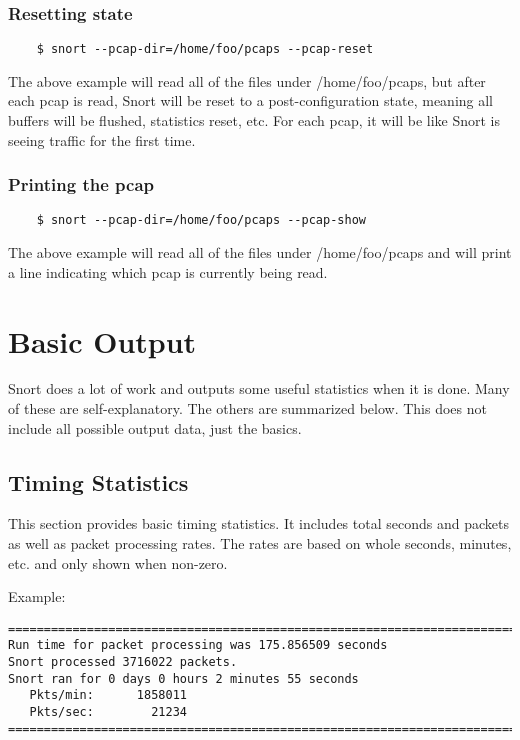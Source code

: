 \documentclass[english]{report}
\begin{document}
\subsubsection{Resetting state}

\begin{verbatim}
    $ snort --pcap-dir=/home/foo/pcaps --pcap-reset
\end{verbatim}

The above example will read all of the files under /home/foo/pcaps, but after
each pcap is read, Snort will be reset to a post-configuration state, meaning
all buffers will be flushed, statistics reset, etc.  For each pcap, it will be
like Snort is seeing traffic for the first time.

\subsubsection{Printing the pcap}

\begin{verbatim}
    $ snort --pcap-dir=/home/foo/pcaps --pcap-show
\end{verbatim}

The above example will read all of the files under /home/foo/pcaps and will
print a line indicating which pcap is currently being read.

\section{Basic Output}

Snort does a lot of work and outputs some useful statistics when it is done.
Many of these are self-explanatory.  The others are summarized below.  This
does not include all possible output data, just the basics.

\subsection{Timing Statistics}

This section provides basic timing statistics.  It includes total seconds and
packets as well as packet processing rates.  The rates are based on whole
seconds, minutes, etc. and only shown when non-zero.

Example:

\begin{verbatim}
===============================================================================
Run time for packet processing was 175.856509 seconds
Snort processed 3716022 packets.
Snort ran for 0 days 0 hours 2 minutes 55 seconds
   Pkts/min:      1858011
   Pkts/sec:        21234
===============================================================================
\end{verbatim}
\end{document}
